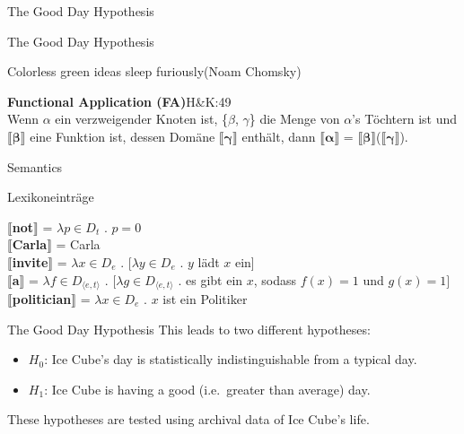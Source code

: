 \documentclass[10pt,ignorenonframetext,,aspectratio=149]{beamer}
\providecommand{\tightlist}{%
  \setlength{\itemsep}{0pt}\setlength{\parskip}{0pt}}
\newcommand{\sem}[1]{\mbox{$\llbracket$\sffamily\textbf{#1}$\rrbracket$}}
\begin{document}
\begin{frame}{The Good Day Hypothesis}
\protect\hypertarget{the-good-day-hypothesis-1}{}
\end{frame}

\begin{frame}{The Good Day Hypothesis}
\protect\hypertarget{the-good-day-hypothesis-2}{}
\begin{quotebox}
    Colorless green ideas sleep furiously\hfill (Noam Chomsky)
\end{quotebox}

\begin{rulebox}
    \textbf{\color{mygreen} Functional Application (FA)}\hfill {\footnotesize H\&K:49}\\Wenn $\alpha$ ein verzweigender Knoten ist, \{$\beta$, $\gamma$\} die Menge von $\alpha$'s Töchtern ist und \sem{$\symbf{\beta}$} eine Funktion ist, dessen Domäne \sem{$\symbf{\gamma}$} enthält, dann \sem{$\symbf{\alpha}$} = \sem{$\symbf{\beta}$}(\sem{$\symbf{\gamma}$}).
\end{rulebox}
\end{frame}

\begin{frame}{Semantics}
\protect\hypertarget{semantics}{}
\begin{exe}
  \ex Lexikoneinträge
  
  \sem{not} = $\lambda p \in D_t$ . $p=0$\\
    \sem{Carla} = Carla\\
    \sem{invite} = $\lambda x \in D_e$ . [$\lambda y \in D_e$ . $y$ lädt $x$ ein]\\
    \sem{a} = $\lambda f \in D_{\langle e, t\rangle}$ . $[\lambda g \in D_{\langle e, t\rangle}$ . es gibt ein $x$, sodass $f(x)=1$ und $g(x)=1]$\\
    \sem{politician} = $\lambda x \in D_e$ . $x$ ist ein Politiker
\end{exe}
\end{frame}

\begin{frame}{The Good Day Hypothesis}
\protect\hypertarget{the-good-day-hypothesis-3}{}
This leads to two different hypotheses:

\begin{itemize}
\tightlist
\item
  \(H_0\): Ice Cube's day is statistically indistinguishable from a
  typical day.
\item
  \(H_1\): Ice Cube is having a good (i.e.~greater than average) day.
\end{itemize}

These hypotheses are tested using archival data of Ice Cube's life.
\end{frame}
\end{document}
